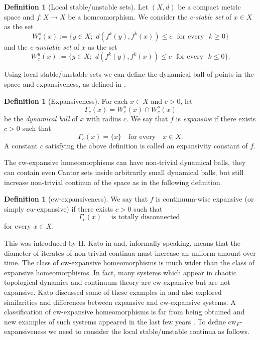 \documentclass{amsart}
\theoremstyle{plain}
\theoremstyle{definition}
\newtheorem{definition}[theorem]{Definition}
\begin{document}
\begin{definition}[Local stable/unstable sets]
Let $(X,d)$ be a compact metric space and $f\colon X\to X$ be a homeomorphism.
We consider the \emph{c-stable set} of $x\in X$ as the set 
$$W^s_{c}(x):=\{y\in X; \,\, d(f^k(y),f^k(x))\leq c \,\,\,\, \textrm{for every} \,\,\,\, k\geq 0\}$$
and the \emph{c-unstable set} of $x$ as the set 
$$W^u_{c}(x):=\{y\in X; \,\, d(f^k(y),f^k(x))\leq c \,\,\,\, \textrm{for every} \,\,\,\, k\leq 0\}.$$
\end{definition}

Using local stable/unstable sets we can define the dynamical ball of points in the space and expansiveness, as defined in \cite{Utz}.

\begin{definition}[Expansiveness]
For each $x\in X$ and $c>0$, let $$\Gamma_{c}(x)=W^u_{c}(x)\cap W^s_{c}(x)$$ be the \emph{dynamical ball} of $x$ with radius $c$. We say that $f$ is \emph{expansive} if there exists $c>0$ such that $$\Gamma_c(x)=\{x\} \,\,\,\,\,\, \text{for every} \,\,\,\,\,\, x\in X.$$ A constant $c$ satisfying the above definition is called an expansivity constant of $f$.
\end{definition}


The cw-expansive homeomorphisms can have non-trivial dynamical balls, they can contain even Cantor sets inside arbitrarily small dynamical balls, but still increase non-trivial continua of the space as in the following definition.

\begin{definition}[cw-expansiveness]\label{cwexp}
We say that $f$ is continuum-wise expansive (or simply $cw$-expansive) if there exists $c>0$ such that $$\Gamma_c(x) \quad \text{ is totally disconnected }$$ for every $x\in X$.
\end{definition}

This was introduced by H. Kato in \cites{K1,K2} and, informally speaking, means that the diameter of iterates of non-trivial continua must increase an uniform amount over time. The class of cw-expansive homeomorphisms is much wider than the class of expansive homeomorphisms. In fact, many systems which appear in chaotic topological dynamics and continuum theory are cw-expansive but are not expansive. Kato discussed some of these examples in \cites{K1,K2} and also explored similarities and differences between expansive and cw-expansive systems. A classification of cw-expansive homeomorphisms is far from being obtained and new examples of such systems appeared in the last few years \cite{AAV,Artanom,ArD,Artrobn,APV,ACC,ACCV2,CC}. To define cw$_F$-expansiveness we need to consider the local stable/unstable continua as follows.
\end{document}
